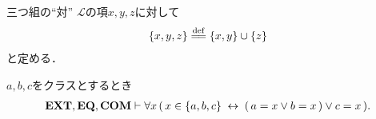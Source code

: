 	\begin{itembox}[l]{三つ組の``対''}
		$\mathcal{L}$の項$x,y,z$に対して
		\begin{align}
			\{x,y,z\} \defeq \{x,y\} \cup \{z\}
		\end{align}
		と定める．
	\end{itembox}
	
	\begin{screen}
		\begin{thm}[三つ組も表示されている要素しか持たない]
		\label{thm:triple_members_are_exactly_the_given_three}
			$a,b,c$をクラスとするとき
			\begin{align}
				\mbox{{\bf EXT}},\mbox{{\bf EQ}},\mbox{\bf COM} \vdash 
				\forall x\, (\, x \in \{a,b,c\} \hspace{0.25em}\leftrightarrow\hspace{0.25em} 
				(\, a = x \vee b = x\, ) \vee c = x\, ).
			\end{align}
		\end{thm}
	\end{screen}
	
